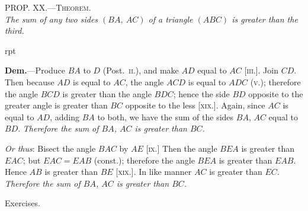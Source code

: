 \documentclass[oneside]{book}
\newcommand\myprop[2]{
\bigskip\Needspace*{4\baselineskip}\begin{center}\textsc{#1}\\\medskip\emph{#2}\par\end{center}
}
\newcommand\exhead[1]{
\Needspace*{5\baselineskip}\begin{center}
\textsf{#1}
\end{center}
}
\newcommand\imgflow[3]{
\setcounter{wrapwidth}{#1}
\begin{wrapfigure}[#2]{r}{\value{wrapwidth}pt}
\begin{center}
\vspace{-0.3in}
\end{center}
\end{wrapfigure}
}
\begin{document}
\myprop{PROP\@. XX\@.---Theorem.}{The sum of any two sides $(BA,\ AC)$ of a triangle $(ABC)$
is greater than the third.}

\imgflow{150}{10}{f036}

\textbf{Dem.}---Produce $BA$ to $D$ (Post.~\textsc{ii}.), and make $AD$
equal to $AC$ [\textsc{iii}.]. Join
$CD$. Then because $AD$ is
equal to $AC$, the angle
$ACD$ is equal to $ADC$ (\textsc{v}.);
therefore the angle $BCD$
is greater than the angle
$BDC$; hence the side $BD$
opposite to the greater angle
is greater than $BC$ opposite
to the less [\textsc{xix}.]. Again,
since $AC$ is equal to $AD$,
adding $BA$ to both, we have the sum of the sides $BA$,
$AC$ equal to $BD$. \emph{Therefore the sum of $BA$, $AC$ is
greater than $BC$.}

\begin{footnotesize}
\emph{Or thus}: Bisect the angle $BAC$ by $AE$ [\textsc{ix}.] Then the angle
$BEA$ is greater than $EAC$; but $EAC = EAB$ (const.); therefore
the angle $BEA$ is greater than $EAB$. Hence $AB$ is greater than
$BE$ [\textsc{xix}.]. In like manner $AC$ is greater than $EC$. \emph{Therefore
the sum of $BA$, $AC$ is greater than $BC$.}
\par\end{footnotesize}

\exhead{Exercises.}
\end{document}
